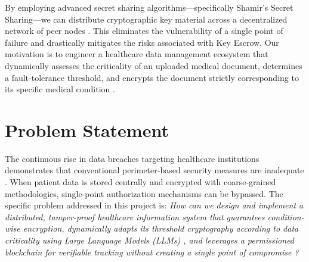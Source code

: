 By employing advanced secret sharing algorithms—specifically Shamir's Secret Sharing—we can distribute cryptographic key material across a decentralized network of peer nodes \cite{li2023privacy}. This eliminates the vulnerability of a single point of failure and drastically mitigates the risks associated with Key Escrow. Our motivation is to engineer a healthcare data management ecosystem that dynamically assesses the criticality of an uploaded medical document, determines a fault-tolerance threshold, and encrypts the document strictly corresponding to its specific medical condition \cite{zhang2021priority}.

\section{Problem Statement}
The continuous rise in data breaches targeting healthcare institutions demonstrates that conventional perimeter-based security measures are inadequate \cite{jin2019review}. When patient data is stored centrally and encrypted with coarse-grained methodologies, single-point authorization mechanisms can be bypassed. The specific problem addressed in this project is: \textit{How can we design and implement a distributed, tamper-proof healthcare information system that guarantees condition-wise encryption, dynamically adapts its threshold cryptography according to data criticality using Large Language Models (LLMs) \cite{wang2024large, sakai2025large}, and leverages a permissioned blockchain for verifiable tracking without creating a single point of compromise \cite{kumar2022permissioned}?}

